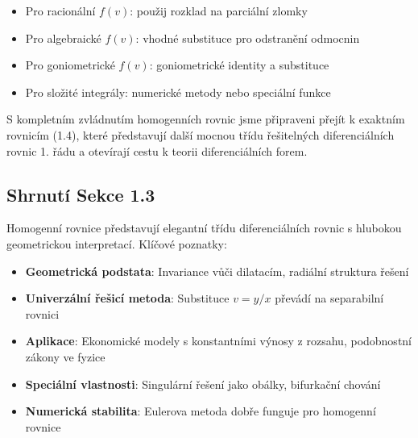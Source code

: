 \vspace{0.6\baselineskip}

\begin{remark}
\begin{itemize}
\item Pro racionální $f(v)$: použij rozklad na parciální zlomky
\item Pro algebraické $f(v)$: vhodné substituce pro odstranění odmocnin
\item Pro goniometrické $f(v)$: goniometrické identity a substituce
\item Pro složité integrály: numerické metody nebo speciální funkce
\end{itemize}
\end{remark}

\vspace{0.8\baselineskip}

\begin{transition}
S kompletním zvládnutím homogenních rovnic jsme připraveni přejít k exaktním rovnicím (1.4), které představují další mocnou třídu řešitelných diferenciálních rovnic 1. řádu a otevírají cestu k teorii diferenciálních forem.
\end{transition}

\vspace{0.8\baselineskip}

\subsection*{Shrnutí Sekce 1.3}

Homogenní rovnice představují elegantní třídu diferenciálních rovnic s hlubokou geometrickou interpretací. Klíčové poznatky:

\begin{itemize}
\item \textbf{Geometrická podstata}: Invariance vůči dilatacím, radiální struktura řešení
\item \textbf{Univerzální řešicí metoda}: Substituce $v = y/x$ převádí na separabilní rovnici
\item \textbf{Aplikace}: Ekonomické modely s konstantními výnosy z rozsahu, podobnostní zákony ve fyzice
\item \textbf{Speciální vlastnosti}: Singulární řešení jako obálky, bifurkační chování
\item \textbf{Numerická stabilita}: Eulerova metoda dobře funguje pro homogenní rovnice
\end{itemize}

